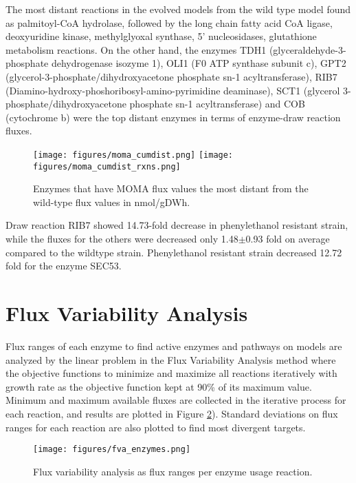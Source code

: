 The most distant reactions in the evolved models from the wild type model found as palmitoyl-CoA hydrolase, followed by the long chain fatty acid CoA ligase, deoxyuridine kinase, methylglyoxal synthase, 5' nucleosidases, glutathione metabolism reactions. On the other hand, the enzymes TDH1 (glyceraldehyde-3-phosphate dehydrogenase isozyme 1), OLI1 (F0 ATP synthase subunit c), GPT2 (glycerol-3-phosphate/dihydroxyacetone phosphate sn-1 acyltransferase), RIB7 (Diamino-hydroxy-phoshoribosyl-amino-pyrimidine deaminase), SCT1 (glycerol 3-phosphate/dihydroxyacetone phosphate sn-1 acyltransferase) and COB (cytochrome b) were the top distant enzymes in terms of enzyme-draw reaction fluxes.

\begin{figure}[H]
  \begin{center}
  \texttt{[image: figures/moma\_cumdist.png]}
  \texttt{[image: figures/moma\_cumdist\_rxns.png]}
  \caption[Enzymes that have MOMA flux values the most distant from the wild-type flux values in nmol/gDWh]{Enzymes that have MOMA flux values the most distant from the wild-type flux values in nmol/gDWh.}
  \label{fig:moma_cumdist}
  \end{center}
\end{figure}

Draw reaction RIB7 showed 14.73-fold decrease in phenylethanol resistant strain, while the fluxes for the others were decreased only 1.48$\pm$0.93 fold on average compared to the wildtype strain. Phenylethanol resistant strain decreased 12.72 fold for the enzyme SEC53.

\section{Flux Variability Analysis}
Flux ranges of each enzyme to find active enzymes and pathways on models are analyzed by the linear problem in the Flux Variability Analysis method where the objective functions to minimize and maximize all reactions iteratively with growth rate as the objective function kept at 90\% of its maximum value. Minimum and maximum available fluxes are collected in the iterative process for each reaction, and results are plotted in Figure \ref{fig:fva_enzymes}). Standard deviations on flux ranges for each reaction are also plotted to find most divergent targets.

\begin{figure}[H]
  \begin{center}
  \texttt{[image: figures/fva\_enzymes.png]}
  \caption[Flux variability analysis results as flux ranges per enzyme usage reaction, sorted by the wild-type flux ranges]{Flux variability analysis as flux ranges per enzyme usage reaction.}
  \end{center}
  \label{fig:fva_enzymes}
  \end{figure}

